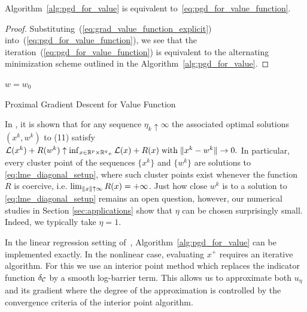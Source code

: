 \begin{lemma}\label{lem:equivalence}
Algorithm~\ref{alg:pgd_for_value} is equivalent to~\eqref{eq:pgd_for_value_function}. 
\end{lemma}
\begin{proof}
Substituting~(\ref{eq:grad_value_function_explicit}) into~(\ref{eq:pgd_for_value_function}), 
we see that the iteration~(\ref{eq:pgd_for_value_function}) is equivalent to the alternating minimization scheme outlined in the Algorithm~\ref{alg:pgd_for_value}.
\end{proof}
\begin{algorithm}[H]
\SetAlgoLined
$w = w_0$ \\
 \caption{\label{alg:pgd_for_value}Proximal Gradient Descent for Value Function}
\end{algorithm}
\smallskip

In \cite[Theorem 6]{Theory1}, it is shown that
for any sequence $\eta_k\uparrow\infty$ the associated optimal solutions $(x^k,w^k)$ 
to (11) satisfy
\(
\mathcal{L}(x^k)+R(w^k)\uparrow 
\inf_{x\in{\operatorname{\mathbb{R}}^p}\times{\operatorname{\mathbb{R}}^q}_+}\mathcal{L}(x)+R(x) \;
\text{with}\; \Vert{x^k-w^k}\Vert\rightarrow 0.
\)
In particular, every cluster point of the sequences $\{x^k\}$ and $\{w^k\}$ are solutions
to \eqref{eq:lme_diagonal_setup}, where such cluster points exist whenever
the function $R$ is coercive, i.e. $\lim_{\left\Vert x\right\Vert\uparrow\infty}R(x)=+\infty$.
Just how close $w^k$ is to a solution to \eqref{eq:lme_diagonal_setup} remains
an open question, however, our numerical studies in Section \ref{sec:applications}
show that $\eta$ can be chosen surprisingly small. Indeed, we typically take $\eta=1$.


In the linear regression setting of~\cite{Zheng2019SR3}, 
Algorithm~\ref{alg:pgd_for_value} can be implemented exactly. 
In the nonlinear case, evaluating $x^+$ requires an iterative algorithm. 
For this we use an interior point method which replaces the indicator function
$\delta_{\mathcal{C}}$ by a smooth log-barrier term. This allows us to approximate both
$u_\eta$ and its gradient where  
the degree of the approximation is controlled by the convergence 
criteria of the interior point algorithm.  

